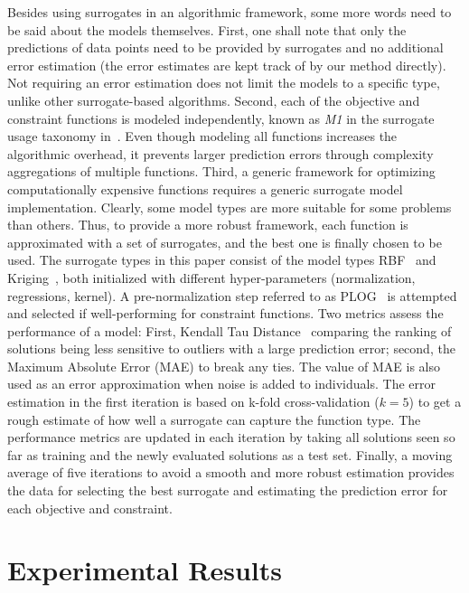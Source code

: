 \documentclass[journal]{IEEEtran}
\begin{document}
Besides using surrogates in an algorithmic framework, some more words need to be said about the models themselves.  
First, one shall note that only the predictions of data points need to be provided by surrogates and no additional error estimation (the error estimates are kept track of by our method directly). Not requiring an error estimation does not limit the models to a specific type, unlike other surrogate-based algorithms.
Second, each of the objective and constraint functions is modeled independently, known as \emph{M1} in the surrogate usage taxonomy in~\cite{2019-deb-taxonomy}.
Even though modeling all functions increases the algorithmic overhead, it prevents larger prediction errors through complexity aggregations of multiple functions. 
Third, a generic framework for optimizing computationally expensive functions requires a generic surrogate model implementation. 
Clearly, some model types are more suitable for some problems than others. Thus, to provide a more robust framework, each function is approximated with a set of surrogates, and the best one is finally chosen to be used.
The surrogate types in this paper consist of the model types RBF~\cite{1971-hardy-rbf} and Kriging~\cite{1951-krige-mine}, both initialized with different hyper-parameters (normalization, regressions, kernel). 
A pre-normalization step referred to as PLOG~\cite{2017-bagheri-sacobra} is attempted and selected if well-performing for constraint functions.
Two metrics assess the performance of a model: First, Kendall Tau Distance~\cite{1938-kendall-tau} comparing the ranking of solutions being less sensitive to outliers with a large prediction error; second, the Maximum Absolute Error (MAE) to break any ties. The value of MAE is also used as an error approximation when noise is added to individuals.
The error estimation in the first iteration is based on k-fold cross-validation ($k=5$) to get a rough estimate of how well a surrogate can capture the function type. The performance metrics are updated in each iteration by taking all solutions seen so far as training and the newly evaluated solutions as a test set. Finally, a moving average of five iterations to avoid a smooth and more robust estimation provides the data for selecting the best surrogate and estimating the prediction error for each objective and constraint.



\section{Experimental Results}
\label{sec:results}
\end{document}
